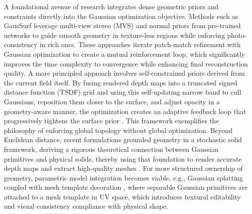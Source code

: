 \documentclass[11pt,a4paper]{article}
\begin{document}
A foundational avenue of research integrates dense geometric priors and constraints directly into the Gaussian optimization objective. Methods such as GausSurf \cite{arxiv:2411.19454v2} leverage multi-view stereo (MVS) and normal priors from pre-trained networks to guide smooth geometry in texture-less regions while enforcing photo-consistency in rich ones. These approaches iterate patch-match refinement with Gaussian optimization to create a mutual reinforcement loop, which significantly improves the time complexity to convergence while enhancing final reconstruction quality. A more principled approach involves self-constrained priors derived from the current field itself. By fusing rendered depth maps into a truncated signed distance function (TSDF) grid and using this self-updating narrow band to cull Gaussians, reposition them closer to the surface, and adjust opacity in a geometry-aware manner, the optimization creates an adaptive feedback loop that progressively tightens the surface prior \cite{arxiv:2603.19682v2}. This framework exemplifies the philosophy of enforcing global topology without global optimization. Beyond Euclidean distance, recent formulations grounded geometry in a stochastic solid framework, deriving a rigorous theoretical connection between Gaussian primitives and physical solids, thereby using that foundation to render accurate depth maps and extract high-quality meshes \cite{arxiv:2601.17835v2}. For more structured ownership of geometry, parametric model integration becomes viable, e.g., Gaussian splatting coupled with mesh template decoration \cite{arxiv:2512.09162v3}, where separable Gaussian primitives are attached to a mesh template in UV space, which introduces textural editability and visual consistency compliance with physical shape.
\end{document}
